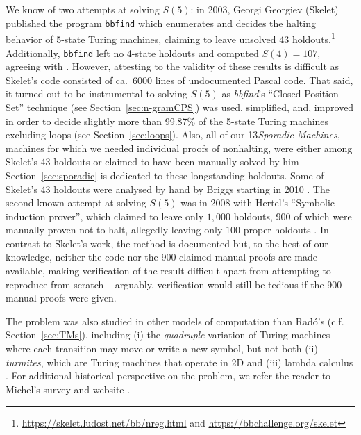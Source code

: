 \documentclass[a4paper,british]{article}
\theoremstyle{definition} %
\numberwithin{equation}{section}
\theoremstyle{definition} %
\newcommand{\ts}[1]{{\color{red}#1}}
\newcommand{\rado}{Rad\'o\xspace}
\newcommand{\numSporadic}{13\xspace}
\begin{document}
\newcommand{\SkeletHoldoutsSporadic}{\ts{XX}\xspace}

We know of two attempts at solving $S(5)$: in 2003, Georgi Georgiev (Skelet) published the program \texttt{bbfind} \cite{Skelet_bbfind} which enumerates and decides the halting behavior of 5-state Turing machines, claiming to leave unsolved 43 holdouts.\footnote{\url{https://skelet.ludost.net/bb/nreg.html} and \url{https://bbchallenge.org/skelet}} Additionally, \texttt{bbfind} left no 4-state holdouts and computed $S(4) = 107$, agreeing with \cite{Brady83}. However, attesting to the validity of these results is difficult as Skelet's code consisted of ca.~6000 lines of undocumented Pascal code. That said, it turned out to be instrumental to solving $S(5)$ as \textit{bbfind}'s ``Closed Position Set'' technique (see Section~\ref{sec:n-gramCPS}) was used, simplified, and, improved in order to decide slightly more than 99.87\% of the 5-state Turing machines excluding loops (see Section~\ref{sec:loops}). Also, all of our \numSporadic \textit{Sporadic Machines}, \ie machines for which we needed individual proofs of nonhalting, were either among Skelet's 43 holdouts or claimed to have been manually solved by him -- Section~\ref{sec:sporadic} is dedicated to these longstanding holdouts. Some of Skelet's 43 holdouts were analysed by hand by Briggs starting in 2010 \cite{DanBriggs}. The second known attempt at solving $S(5)$ was in 2008 with Hertel's ``Symbolic induction prover'', which claimed to leave only $1{,}000$ holdouts, $900$ of which were manually proven not to halt, allegedly leaving only $100$ proper holdouts \cite{Hertel}. In contrast to Skelet's work, the method is documented but, to the best of our knowledge, neither the code nor the 900 claimed manual proofs are made available, making verification of the result difficult apart from attempting to reproduce from scratch -- arguably, verification would still be tedious if the 900 manual proofs were given.

The \BBfull problem was also studied in other models of computation than \rado's (c.f. Section~\ref{sec:TMs}), including (i) the \textit{quadruple} variation of Turing machines where each transition may move or write a new symbol, but not both \cite{Ross2003,Ross2005} (ii) \textit{turmites}, which are Turing machines that operate in 2D \cite{BradyMeaningOfLife} and (iii) lambda calculus \cite{tromp_oeis}. For additional historical perspective on the \BBfull problem, we refer the reader to Michel's survey and website \cite{michel2019busy,PMichel_website}.
\end{document}
